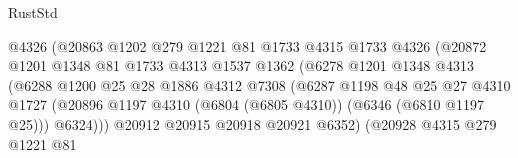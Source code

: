 \begin{lexlean}{RustStd}
\begin{coremodule}
                                      @4326
                                      (@20863
                                        @1202
                                        @279
                                        @1221
                                        @81
                                        @1733
                                        @4315
                                        @1733
                                        @4326
                                        (@20872
                                          @1201
                                          @1348
                                          @81
                                          @1733
                                          @4313
                                          @1537
                                          @1362
                                          (@6278
                                            @1201
                                            @1348
                                            @4313
                                            (@6288
                                              @1200
                                              @25
                                              @28
                                              @1886
                                              @4312
                                              @7308
                                              (@6287
                                                @1198
                                                @48
                                                @25
                                                @27
                                                @4310
                                                @1727
                                                (@20896
                                                  @1197
                                                  @4310
                                                  (@6804 (@6805 @4310))
                                                  (@6346 (@6810 @1197 @25)))
                                                @6324)))
                                          @20912
                                          @20915
                                          @20918
                                          @20921
                                          @6352)
                                        (@20928
                                          @4315
                                          @279
                                          @1221
                                          @81

\end{coremodule}
\end{lexlean}

